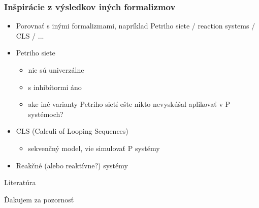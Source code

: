 \begin{frame}[t]\frametitle{Inšpirácie z výsledkov iných formalizmov}
\begin{itemize}
  \item Porovnať s inými formalizmami, napríklad Petriho siete / reaction systems / CLS / ...
  \item Petriho siete
  \begin{itemize}
    \item nie sú univerzálne
    \item s inhibítormi áno
    \item ake iné varianty Petriho sietí ešte nikto nevyskúšal aplikovať v P systémoch?
  \end{itemize}
  \item CLS (Calculi of Looping Sequences)
  \begin{itemize}
    \item sekvenčný model, vie simulovať P systémy \cite{Barbuti07CLS}
  \end{itemize}
  \item Reakčné (alebo reaktívne?) systémy
\end{itemize}
\end{frame}
\note{}



\begin{frame}[allowframebreaks]{Literatúra}


\end{frame}

\begin{frame}[plain]
\begin{center}
  Ďakujem za pozornosť
\end{center}
\end{frame}

